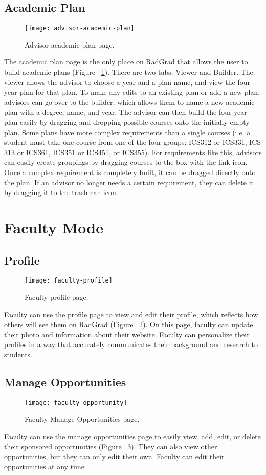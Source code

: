 \subsection{Academic Plan}
\begin{figure}[htbp!]
\centering
\texttt{[image: advisor-academic-plan]}
\caption{Advisor academic plan page.}
\label{academic-plan}
\end{figure}
The academic plan page is the only place on RadGrad that allows the user to build academic plans (Figure ~\ref{academic-plan}). There are two tabs: Viewer and Builder. The viewer allows the advisor to choose a year and a plan name, and view the four year plan for that plan. To make any edits to an existing plan or add a new plan, advisors can go over to the builder, which allows them to name a new academic plan with a degree, name, and year. The advisor can then build the four year plan easily by dragging and dropping possible courses onto the initially empty plan. Some plans have more complex requirements than a single courses (i.e. a student must take one course from one of the four groups: ICS312 or ICS331, ICS 313 or ICS361, ICS351 or ICS451, or ICS355). For requirements like this, advisors can easily create groupings by dragging courses to the box with the link icon. Once a complex requirement is completely built, it can be dragged directly onto the plan. If an advisor no longer needs a certain requirement, they can delete it by dragging it to the trash can icon. 

\section{Faculty Mode}
\subsection{Profile}
\begin{figure}[htbp!]
\centering
\texttt{[image: faculty-profile]}
\caption{Faculty profile page.}
\label{faculty}
\end{figure}
Faculty can use the profile page to view and edit their profile, which reflects how others will see them on RadGrad (Figure ~\ref{faculty}). On this page, faculty can update their photo and information about their website. Faculty can personalize their profiles in a way that accurately communicates their background and research to students. 
\subsection{Manage Opportunities}
\begin{figure}[htbp!]
\centering
\texttt{[image: faculty-opportunity]}
\caption{Faculty Manage Opportunities page.}
\label{faculty-manage-opportunities}
\end{figure}
Faculty can use the manage opportunities page to easily view, add, edit, or delete their sponsored opportunities (Figure ~\ref{faculty-manage-opportunities}). They can also view other opportunities, but they can only edit their own. Faculty can edit their opportunities at any time.

